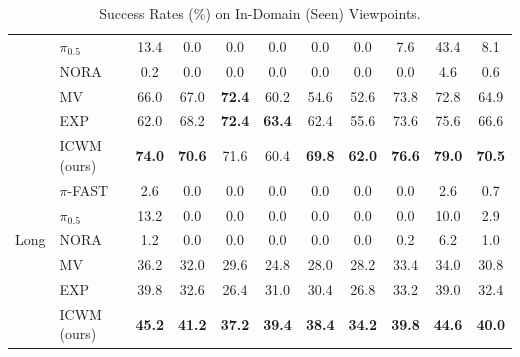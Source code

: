 \documentclass{llmxive}
\providecommand{\rowhighlight}{\rowcolor{deltaBg}}
\begin{document}
\begin{table}[t]
\begin{tabular}{llccccccccc}
&$\pi_{0.5}$ &13.4 &0.0 &0.0 &0.0 &0.0 &0.0 &7.6 &43.4 &8.1 \\
&NORA &0.2 &0.0 &0.0 &0.0 &0.0 &0.0 &0.0 &4.6 &0.6 \\
&MV &66.0 &67.0 &\textbf{72.4} &60.2 &54.6 &52.6 &73.8 &72.8 &64.9 \\
&EXP &62.0 &68.2 &\textbf{72.4} &\textbf{63.4} &62.4 &55.6 &73.6 &75.6 &66.6 \\
\rowhighlight
&ICWM (ours)  &\textbf{74.0} &\textbf{70.6} &71.6 &60.4 &\textbf{69.8} &\textbf{62.0} &\textbf{76.6} &\textbf{79.0} &\textbf{70.5} \\
\midrule
\multirow{5}{*}{Long} &$\pi$-FAST &2.6 &0.0 &0.0 &0.0 &0.0 &0.0 &0.0 &2.6 &0.7 \\
&$\pi_{0.5}$ &13.2 &0.0 &0.0 &0.0 &0.0 &0.0 &0.0 &10.0 &2.9 \\
&NORA &1.2 &0.0 &0.0 &0.0 &0.0 &0.0 &0.2 &6.2 &1.0 \\
&MV &36.2 &32.0 &29.6 &24.8 &28.0 &28.2 &33.4 &34.0 &30.8 \\
&EXP &39.8 &32.6 &26.4 &31.0 &30.4 &26.8 &33.2 &39.0 &32.4 \\
\rowhighlight
&ICWM (ours)  &\textbf{45.2} &\textbf{41.2} &\textbf{37.2} &\textbf{39.4} &\textbf{38.4} &\textbf{34.2} &\textbf{39.8} &\textbf{44.6} &\textbf{40.0} \\
\bottomrule
\end{tabular}
\caption{Success Rates (\%) on In-Domain (Seen) Viewpoints.}
\label{tab: seen}
\end{table}
\end{document}
